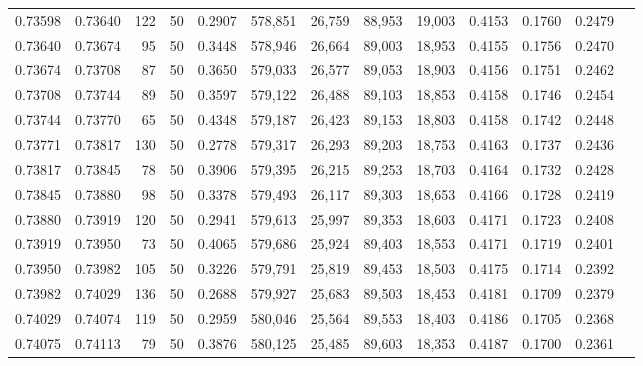 \begin{tabular}{rrrrrrrrrrrrr}
0.73598 & 0.73640 &   122 &  50 &                                     0.2907 & 578,851 &  26,759 &  88,953 &  19,003 & 0.4153 & 0.1760 & 0.2479 \\
0.73640 & 0.73674 &    95 &  50 &                                     0.3448 & 578,946 &  26,664 &  89,003 &  18,953 & 0.4155 & 0.1756 & 0.2470 \\
0.73674 & 0.73708 &    87 &  50 &                                     0.3650 & 579,033 &  26,577 &  89,053 &  18,903 & 0.4156 & 0.1751 & 0.2462 \\
0.73708 & 0.73744 &    89 &  50 &                                     0.3597 & 579,122 &  26,488 &  89,103 &  18,853 & 0.4158 & 0.1746 & 0.2454 \\
0.73744 & 0.73770 &    65 &  50 &                                     0.4348 & 579,187 &  26,423 &  89,153 &  18,803 & 0.4158 & 0.1742 & 0.2448 \\
0.73771 & 0.73817 &   130 &  50 &                                     0.2778 & 579,317 &  26,293 &  89,203 &  18,753 & 0.4163 & 0.1737 & 0.2436 \\
0.73817 & 0.73845 &    78 &  50 &                                     0.3906 & 579,395 &  26,215 &  89,253 &  18,703 & 0.4164 & 0.1732 & 0.2428 \\
0.73845 & 0.73880 &    98 &  50 &                                     0.3378 & 579,493 &  26,117 &  89,303 &  18,653 & 0.4166 & 0.1728 & 0.2419 \\
0.73880 & 0.73919 &   120 &  50 &                                     0.2941 & 579,613 &  25,997 &  89,353 &  18,603 & 0.4171 & 0.1723 & 0.2408 \\
0.73919 & 0.73950 &    73 &  50 &                                     0.4065 & 579,686 &  25,924 &  89,403 &  18,553 & 0.4171 & 0.1719 & 0.2401 \\
0.73950 & 0.73982 &   105 &  50 &                                     0.3226 & 579,791 &  25,819 &  89,453 &  18,503 & 0.4175 & 0.1714 & 0.2392 \\
0.73982 & 0.74029 &   136 &  50 &                                     0.2688 & 579,927 &  25,683 &  89,503 &  18,453 & 0.4181 & 0.1709 & 0.2379 \\
0.74029 & 0.74074 &   119 &  50 &                                     0.2959 & 580,046 &  25,564 &  89,553 &  18,403 & 0.4186 & 0.1705 & 0.2368 \\
0.74075 & 0.74113 &    79 &  50 &                                     0.3876 & 580,125 &  25,485 &  89,603 &  18,353 & 0.4187 & 0.1700 & 0.2361 \\

\end{tabular}
